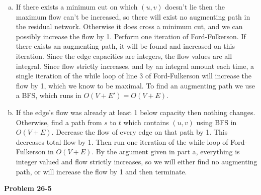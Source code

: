 \documentclass{article}
\begin{document}
\begin{enumerate}[a.]
\item If there exists a minimum cut on which $(u,v)$ doesn't lie then the maximum flow can't be increased, so there will exist no augmenting path in the residual network.  Otherwise it does cross a minimum cut, and we can possibly increase the flow by 1.   Perform one iteration of Ford-Fulkerson.  If there exists an augmenting path, it will be found and increased on this iteration.  Since the edge capacities are integers, the flow values are all integral.  Since flow strictly increases, and by an integral amount each time, a single iteration of the while loop of line 3 of Ford-Fulkerson will increase the flow by 1, which we know to be maximal.  To find an augmenting path we use a BFS, which runs in $O(V+E') = O(V+E)$. 

\item If the edge's flow was already at least 1 below capacity then nothing changes.  Otherwise, find a path from $s$ to $t$ which contains $(u,v)$ using BFS in $O(V+E)$.  Decrease the flow of every edge on that path by 1.  This decreases total flow by 1.  Then run one iteration of the while loop of Ford-Fulkerson in $O(V+E)$.  By the argument given in part a, everything is integer valued and flow strictly increases, so we will either find no augmenting path, or will increase the flow by 1 and then terminate. 
\end{enumerate} 

\noindent\textbf{Problem 26-5}\\
\end{document}

